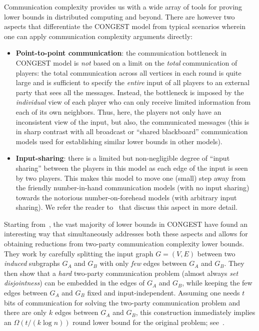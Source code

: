 \documentclass[11pt]{article}
\theoremstyle{definition}
\begin{document}
Communication complexity provides us with a wide array of tools for proving lower bounds in distributed computing and beyond. 
There are however two aspects that differentiate the CONGEST model from typical scenarios wherein one can apply communication complexity arguments directly: 
\vspace{-15pt}
\begin{itemize}[leftmargin=10pt]
	\item \textbf{Point-to-point communication}: the communication bottleneck in CONGEST model is \emph{not} based on a limit on the \emph{total} communication of players: the total communication across all vertices in each round
	is quite large and is sufficient to specify the \emph{entire} input of all players to an external party that sees all the messages. Instead, the bottleneck is imposed by the \emph{individual} view of each player who can only receive 
	limited information from each of its own neighbors. Thus, here, the players not only have an inconsistent view of the input, but also, the communicated messages (this is in sharp contrast with all broadcast 
	or ``shared blackboard'' communication models used for establishing similar lower bounds in other models). %
	\item \textbf{Input-sharing}: there is a limited but non-negligible degree of ``input sharing'' between the players in this model as each edge of the input is seen by two players. This makes
	this model to move one (small) step away from the friendly number-in-hand communication models (with no input sharing) towards the notorious number-on-forehead models (with arbitrary input sharing). We 
	refer the reader to~\cite{NelsonY19,AssadiKO20,AssadiKZ22} that discuss this aspect in more detail. 
\end{itemize}
\vspace{-5pt}

Starting from~\cite{PelegR00}, the vast majority of lower bounds in CONGEST have found an interesting way that simultaneously addresses both these aspects and allows for obtaining reductions from two-party communication complexity 
lower bounds. They work by carefully splitting the input graph $G=(V,E)$ between two \emph{induced} subgraphs $G_A$ and $G_B$ with only \emph{few} edges between $G_A$ and $G_B$. They then show that a 
\emph{hard} two-party communication problem (almost always \emph{set disjointness}) can be embedded in the edges of $G_A$ and $G_B$, while keeping the few edges between $G_A$ and $G_B$ fixed and input-independent. 
Assuming one needs $t$ bits of communication for solving the two-party communication problem and there are only $k$ edges between $G_A$ and $G_B$, this construction immediately implies 
an $\Omega(t/(k\log{n}))$ round lower bound for the original problem; see~.
\end{document}
